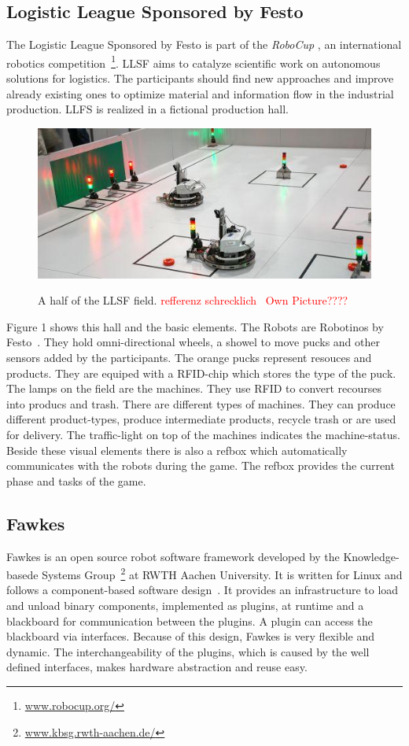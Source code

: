 \documentclass[11pt,a4paper,titlepage]{article}
\begin{document}
\subsection{Logistic League Sponsored by Festo}
The Logistic League Sponsored by Festo is part of the \textit{RoboCup
}, an international robotics competition~\footnote{\url{www.robocup.org/}}. LLSF aims to catalyze scientific work on autonomous solutions for logistics. The participants should find new approaches and improve already existing ones to optimize material and information flow in the industrial production. LLFS is realized in a fictional production hall. 
\begin{figure}
\includegraphics[scale=0.7]{pics/llsf1}
\label{Figure 1}
\caption{A half of the LLSF field.  \textcolor{red}{refferenz schrecklich~\cite{LLSFGermanOpen} Own Picture????}}
\end{figure}
Figure 1 shows this hall and the basic elements. The Robots are Robotinos by Festo~\cite{Robotino}. They hold omni-directional wheels, a showel to move pucks and other sensors added by the participants. The orange pucks represent resouces and products. They are equiped with a RFID-chip which stores the type of the puck. The lamps on the field are the machines. They use RFID to convert recourses into producs and trash. There are different types of machines. They can produce different product-types, produce intermediate products, recycle trash or are used for delivery. The traffic-light on top of the machines indicates the machine-status. Beside these visual elements there is also a refbox which automatically communicates with the robots during the game. The refbox provides the current phase and tasks of the game.
\subsection{Fawkes}
Fawkes is an open source robot software framework developed by the Knowledge-basede Systems Group~\footnote{\url{www.kbsg.rwth-aachen.de/}} at RWTH Aachen University. It is written for Linux and follows a component-based software design~\cite{FawkesDesign}. It provides an infrastructure to load and unload binary components, implemented as plugins, at runtime and a blackboard for communication between the plugins. A plugin can access the blackboard via interfaces. Because of this design, Fawkes is very flexible and dynamic. The interchangeability of the plugins, which is caused by the well defined interfaces, makes hardware abstraction and reuse easy.\\
\end{document}
